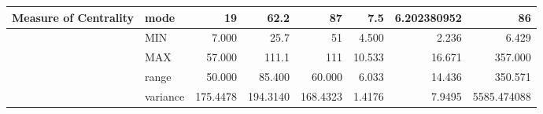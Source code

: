 \begin{table}[ht]
\begin{adjustbox}{width = \textwidth, center}
\begin{tabular}{|cl|r|r|r|r|r|r|}
        \multicolumn{1}{|c|}{\multirow{-3}{*}{Measure of Centrality}}  & \cellcolor[HTML]{B6D7A8}mode                                                 & 19                                               & 62.2                                                     & 87                                                      & 7.5                                                              & 6.202380952                                                                  & 86                                                                               \\ \hline
        \multicolumn{1}{|c|}{}                                         & \cellcolor[HTML]{CFE2F3}MIN                                                  & 7.000                                            & 25.7                                                     & 51                                                      & 4.500                                                            & 2.236                                                                        & 6.429                                                                            \\ \cline{2-8} 
        \multicolumn{1}{|c|}{}                                         & \cellcolor[HTML]{CFE2F3}MAX                                                  & 57.000                                           & 111.1                                                    & 111                                                     & 10.533                                                           & 16.671                                                                       & 357.000                                                                          \\ \cline{2-8} 
        \multicolumn{1}{|c|}{}                                         & \cellcolor[HTML]{CFE2F3}range                                                & 50.000                                           & 85.400                                                   & 60.000                                                  & 6.033                                                            & 14.436                                                                       & 350.571                                                                          \\ \cline{2-8} 
        \multicolumn{1}{|c|}{}                                         & \cellcolor[HTML]{CFE2F3}variance                                             & 175.4478                                         & 194.3140                                                 & 168.4323                                                & 1.4176                                                           & 7.9495                                                                       & 5585.474088                                                                      \\ \cline{2-8} 

\end{tabular}
\end{adjustbox}
\end{table}
